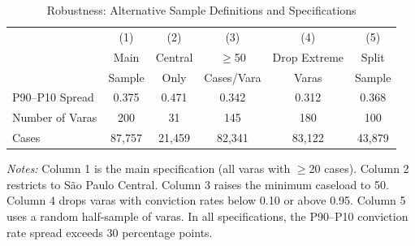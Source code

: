 \begin{table}[htbp]
\centering
\caption{Robustness: Alternative Sample Definitions and Specifications}
\label{tab:robustness}
\begin{tabular}{lccccc}
\toprule
& (1) & (2) & (3) & (4) & (5) \\
& Main & Central & $\geq$50 & Drop Extreme & Split \\
& Sample & Only & Cases/Vara & Varas & Sample \\
\midrule
P90--P10 Spread & 0.375 & 0.471 & 0.342 & 0.312 & 0.368 \\
Number of Varas & 200 & 31 & 145 & 180 & 100 \\
Cases & 87{,}757 & 21{,}459 & 82{,}341 & 83{,}122 & 43{,}879 \\
\bottomrule
\end{tabular}
\begin{flushleft}\small
\textit{Notes:} Column 1 is the main specification (all varas with $\geq$20 cases). Column 2 restricts to S\~ao Paulo Central. Column 3 raises the minimum caseload to 50. Column 4 drops varas with conviction rates below 0.10 or above 0.95. Column 5 uses a random half-sample of varas. In all specifications, the P90--P10 conviction rate spread exceeds 30 percentage points.
\end{flushleft}
\end{table}